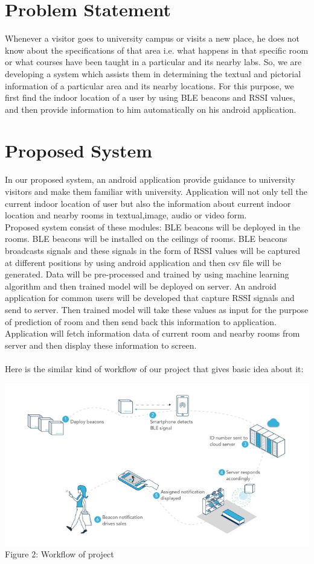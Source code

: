 \documentclass{article}
\begin{document}
\section{Problem Statement}
Whenever a visitor goes to university campus or visits a new place, he does not know about the specifications of that area i.e. what happens in that specific room or what courses have been taught in a particular and its nearby labs. So, we are developing a system which assists them in determining the textual and pictorial information of a particular area and its nearby locations. For this purpose, we first find the indoor location of a user by using BLE beacons and RSSI values, and then provide information to him automatically on his android application. 
\section{Proposed System}
In our proposed system, an android application provide guidance to university visitors and make them familiar with university. Application will not only tell the current indoor location of user but also the information about current indoor location and nearby rooms in textual,image, audio or video form.
\\
Proposed system consist of these modules:
BLE beacons will be deployed in the rooms. BLE beacons will be installed on the ceilings of rooms.
BLE beacons broadcasts signals and these signals in the form of RSSI values will be captured at different positions by using android application and then csv file will be generated.
Data will be pre-processed and trained by using machine learning algorithm and then trained model will be deployed on server.
An android application for common users will be developed that capture RSSI signals and send to server. Then trained model will take these values as input for the purpose of prediction of room and then send back this information to application.
Application will fetch information data of current room and nearby rooms from server and then display these information to screen.
\\
\\
Here is the similar kind of workflow of our project that gives basic idea about it:
\begin{center}
\includegraphics[scale=0.8]{diagram}
\\Figure 2: Workflow of project 
\end{center}
\end{document}
